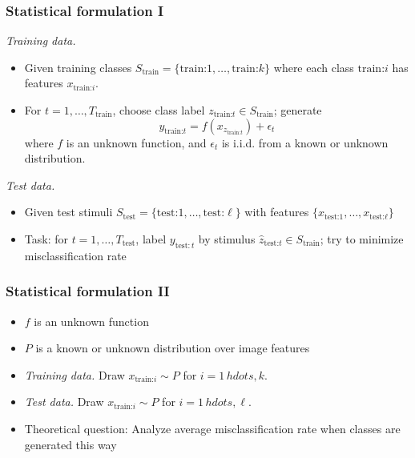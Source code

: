 \documentclass{beamer}
\begin{document}
\begin{frame}
\frametitle{Statistical formulation I}
\emph{Training data.}
\begin{itemize}
\item
Given training classes $S_{\text{train}} = \{\text{train:}1,\hdots,
\text{train:}k\}$ where each class $\text{train:}i$ has features
$x_{\text{train:}i}$.
\item
For $t = 1,\hdots, T_{\text{train}}$, choose class label
$z_{\text{train:} t} \in S_{\text{train}}$; generate
\[
y_{\text{train:} t} = f(x_{z_{\text{train:} t}}) + \epsilon_t
\]
where $f$ is an unknown function, and $\epsilon_t$ is i.i.d. from a
known or unknown distribution.
\end{itemize}
\emph{Test data.}
\begin{itemize}
\item
Given test stimuli $S_{\text{test}} = \{\text{test:}1,\hdots,
\text{test:}\ell\}$ with features $\{x_{\text{test:} 1}, \hdots,
x_{\text{test:} \ell}\}$
\item
Task: for $t = 1,\hdots, T_{\text{test}}$, label $y_{\text{test}: t}$
by stimulus $\hat{z}_{\text{test:} t} \in S_{\text{train}}$; try to
minimize misclassification rate
\end{itemize}
\end{frame}

\begin{frame}
\frametitle{Statistical formulation II}
\begin{itemize}
\item $f$ is an unknown function
\item $P$ is a known or unknown distribution over image features
\item \emph{Training data.} Draw $x_{\text{train:} i} \sim P$ for $i = 1\,hdots, k$.
\item \emph{Test data.} Draw $x_{\text{train:} i} \sim P$ for $i = 1\,hdots, \ell$.
\item Theoretical question: Analyze average misclassification rate when classes are generated this way
\end{itemize}
\end{frame}
\end{document}
